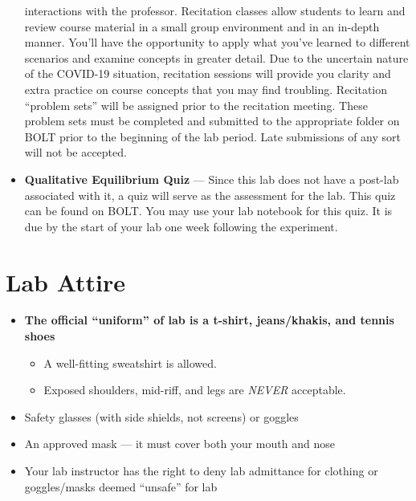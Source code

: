 \documentclass[10pt,letterpaper]{article}
\begin{document}
\begin{itemize}
		interactions with the professor. Recitation classes allow
		students to learn and review course material in a small group
		environment and in an in-depth manner. You'll have the
		opportunity to apply what you’ve learned to different scenarios
		and examine concepts in greater detail.  Due to the uncertain
		nature of the COVID-19 situation, recitation sessions will
		provide you clarity and extra practice on course concepts that
		you may find troubling.  Recitation ``problem sets'' will be
		assigned prior to the recitation meeting.  These problem sets
		must be completed and submitted to the appropriate folder on
		BOLT prior to the beginning of the lab period.  Late submissions
		of any sort will not be accepted. 
	\item \textbf{Qualitative Equilibrium Quiz} --- Since this lab does not
		have a post-lab associated with it, a quiz will serve as the
		assessment for the lab.  This quiz can be found on BOLT.  You
		may use your lab notebook for this quiz.  It is due by the start
		of your lab one week following the experiment. 
\end{itemize}

\section*{Lab Attire}
\begin{itemize}[noitemsep]
	\item \textbf{The official ``uniform'' of lab is a t-shirt,
		jeans/khakis, and tennis shoes}
		\begin{itemize}[nosep]
			\item A well-fitting sweatshirt is allowed.
			\item Exposed shoulders, mid-riff, and legs are
				\emph{NEVER} acceptable.
		\end{itemize}
	\item Safety glasses (with side shields, not screens) or goggles
	\item An approved mask --- it must cover both your mouth and nose
	\item Your lab instructor has the right to deny lab admittance for
		clothing or goggles/masks deemed ``unsafe'' for lab
\end{itemize}
\end{document}
